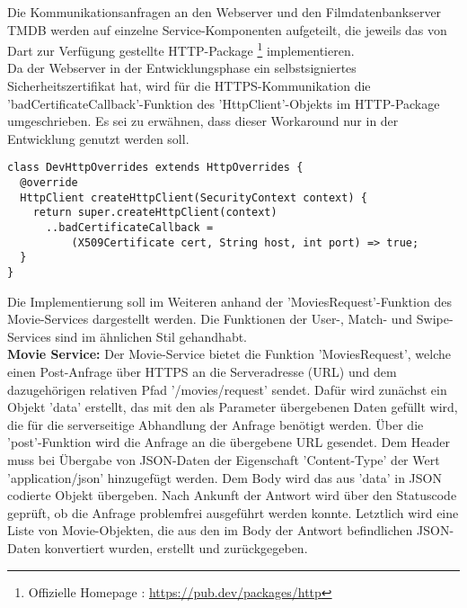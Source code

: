 Die Kommunikationsanfragen an den Webserver und den Filmdatenbankserver TMDB werden auf einzelne Service-Komponenten aufgeteilt, die jeweils das von Dart zur Verfügung gestellte HTTP-Package \footnote{Offizielle Homepage : \url{https://pub.dev/packages/http}} implementieren.\\
Da der Webserver in der Entwicklungsphase ein selbstsigniertes Sicherheitszertifikat hat, wird für die HTTPS-Kommunikation die 'badCertificateCallback'-Funktion des 'HttpClient'-Objekts im HTTP-Package umgeschrieben. Es sei zu erwähnen, dass dieser Workaround nur in der Entwicklung genutzt werden soll. 

\begin{lstlisting}[caption=Bad Certificate - Workaround, label=lst:badcertificateworkaround]
class DevHttpOverrides extends HttpOverrides {
  @override
  HttpClient createHttpClient(SecurityContext context) {
    return super.createHttpClient(context)
      ..badCertificateCallback =
          (X509Certificate cert, String host, int port) => true;
  }
}
\end{lstlisting}

\noindent
Die Implementierung soll im Weiteren anhand der 'MoviesRequest'-Funktion des Movie-Services dargestellt werden. Die Funktionen der User-, Match- und Swipe-Services sind im ähnlichen Stil gehandhabt. \\

\noindent
\textbf{Movie Service:}
Der Movie-Service bietet die Funktion 'MoviesRequest', welche einen Post-Anfrage über HTTPS an die Serveradresse (URL) und dem dazugehörigen relativen Pfad '/movies/request' sendet. Dafür wird zunächst ein Objekt 'data' erstellt, das mit den als Parameter übergebenen Daten gefüllt wird, die für die serverseitige Abhandlung der Anfrage benötigt werden. Über die 'post'-Funktion wird die Anfrage an die übergebene URL gesendet. Dem Header muss bei Übergabe von JSON-Daten der Eigenschaft 'Content-Type' der Wert 'application/json' hinzugefügt werden. Dem Body wird das aus 'data' in JSON codierte Objekt übergeben. Nach Ankunft der Antwort wird über den Statuscode geprüft, ob die Anfrage problemfrei ausgeführt werden konnte. Letztlich wird eine Liste von Movie-Objekten, die aus den im Body der Antwort befindlichen JSON-Daten konvertiert wurden, erstellt und zurückgegeben.

